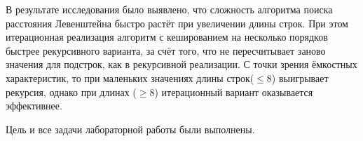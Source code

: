 
В результате исследования было выявлено, что сложность алгоритма поиска расстояния Левенштейна быстро растёт при увеличении длины строк. При этом итерационная реализация алгоритм с кешированием на несколько порядков быстрее рекурсивного варианта, за счёт того, что не пересчитывает заново значения для подстрок, как в рекурсивной реализации. С точки зрения ёмкостных характеристик, то при маленьких значениях длины строк($\leq 8$) выигрывает рекурсия, однако при длинах ($\ge 8$) итерационный вариант оказывается эффективнее.

Цель и все задачи лабораторной работы были выполнены.